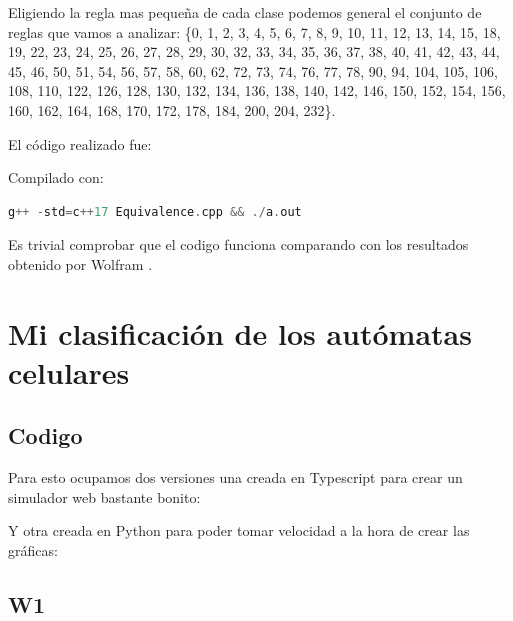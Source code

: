 \documentclass[12pt, fleqn]{report}                             %
\theoremstyle{break}                                            %
\begin{document}
      Eligiendo la regla mas pequeña de cada clase podemos general el conjunto de reglas que vamos a
      analizar: \{0, 1, 2, 3, 4, 5, 6, 7, 8, 9, 10, 11, 12, 13, 14, 15, 18, 19, 22, 23, 24, 25, 26, 27, 28, 29, 
      30, 32, 33, 34, 35, 36, 37, 38, 40, 41, 42, 43, 44, 45, 46, 50, 51, 54, 56, 57, 58, 60, 62, 72, 73, 
      74, 76, 77, 78, 90, 94, 104, 105, 106, 108, 110, 122, 126, 128, 130, 132, 134, 136, 138, 140, 142, 
      146, 150, 152, 154, 156, 160, 162, 164, 168, 170, 172, 178, 184, 200, 204, 232\}.

      El código realizado fue:
      

      Compilado con:
      \begin{lstlisting}[language=C++, gobble=6]
        g++ -std=c++17 Equivalence.cpp && ./a.out
      \end{lstlisting}

      Es trivial comprobar que el codigo funciona comparando con los resultados
      obtenido por Wolfram \cite{Wolfram}.

  \chapter{Mi clasificación de los autómatas celulares}
      \section{Codigo}

        Para esto ocupamos dos versiones una creada en Typescript para crear un simulador
        web bastante bonito:
        

        Y otra creada en Python para poder tomar velocidad a la hora de crear las gráficas:
        

      \clearpage


      \section{W1}
\end{document}
